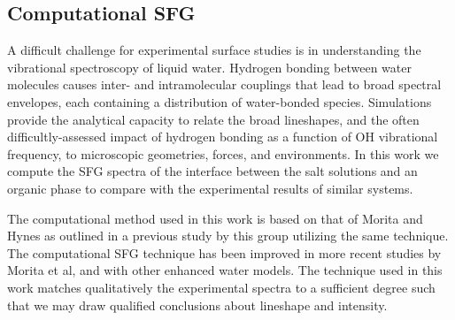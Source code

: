 


\subsection{Computational SFG}
A difficult challenge for experimental surface studies is in understanding the vibrational spectroscopy of liquid water. Hydrogen bonding between water molecules causes inter- and intramolecular couplings that lead to broad spectral envelopes, each containing a distribution of water-bonded species. Simulations provide the analytical capacity to relate the broad lineshapes, and the often difficultly-assessed impact of hydrogen bonding as a function of OH vibrational frequency, to microscopic geometries, forces, and environments. In this work we compute the SFG spectra of the interface between the salt solutions and an organic phase to compare with the experimental results of similar systems.\cite{McFearin2009} 

The computational method used in this work is based on that of Morita and Hynes\cite{Morita2000} as outlined in a previous study by this group utilizing the same technique.\cite{Walker2008} The computational SFG technique has been improved in more recent studies by Morita et al,\cite{Morita2002,Ishiyama2009} and with other enhanced water models. The technique used in this work matches qualitatively the experimental spectra to a sufficient degree such that we may draw qualified conclusions about lineshape and intensity. 


